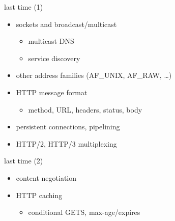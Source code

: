 \date{}
\title{}
\date{}
\usepackage{pgfplots}
\pgfplotsset{compat=1.14}

\begin{frame}
    \titlepage
\end{frame}

\begin{frame}{last time (1)}
    \begin{itemize}
    \item sockets and broadcast/multicast
        \begin{itemize}
        \item multicast DNS
        \item service discovery
        \end{itemize}
    \item other address families (AF\_UNIX, AF\_RAW, \ldots)
    \item HTTP message format
        \begin{itemize}
        \item method, URL, headers, status, body
        \end{itemize}
    \item persistent connections, pipelining
    \item HTTP/2, HTTP/3 multiplexing
    \end{itemize}
\end{frame}

\begin{frame}{last time (2)}
    \begin{itemize}
    \item content negotiation
    \item HTTP caching
        \begin{itemize}
        \item conditional GETS, max-age/expires
        \end{itemize}
    \end{itemize}
\end{frame}

